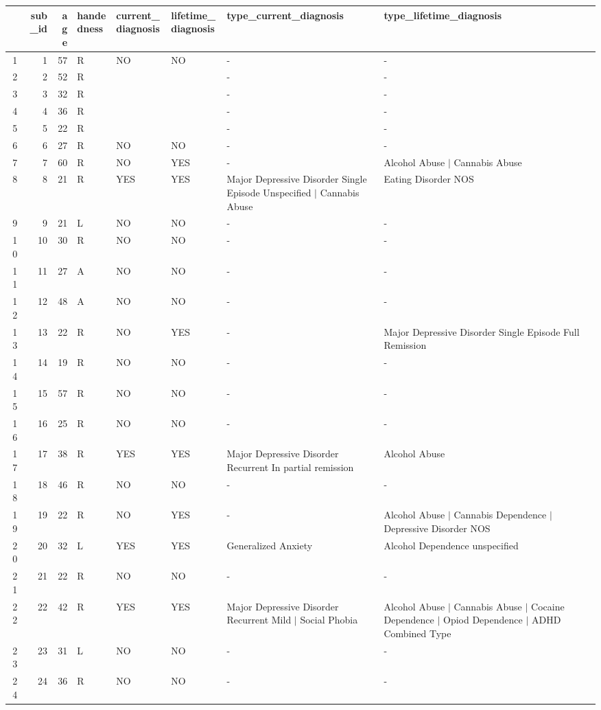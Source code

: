 \begin{table}[ht]
\centering
\begin{tabular}{rrrlllll}
  \hline
 & sub\_id & age & handedness & current\_diagnosis & lifetime\_diagnosis & type\_current\_diagnosis & type\_lifetime\_diagnosis \\ 
  \hline
1 &   1 &  57 & R & NO & NO & - & - \\ 
  2 &   2 &  52 & R &  &  & - & - \\ 
  3 &   3 &  32 & R &  &  & - & - \\ 
  4 &   4 &  36 & R &  &  & - & - \\ 
  5 &   5 &  22 & R &  &  & - & - \\ 
  6 &   6 &  27 & R & NO & NO & - & - \\ 
  7 &   7 &  60 & R & NO & YES & - & Alcohol Abuse $|$ Cannabis Abuse \\ 
  8 &   8 &  21 & R & YES & YES & Major Depressive Disorder Single Episode Unspecified $|$ Cannabis Abuse & Eating Disorder NOS \\ 
  9 &   9 &  21 & L & NO & NO & - & - \\ 
  10 &  10 &  30 & R & NO & NO & - & - \\ 
  11 &  11 &  27 & A & NO & NO & - & - \\ 
  12 &  12 &  48 & A & NO & NO & - & - \\ 
  13 &  13 &  22 & R & NO & YES & - & Major Depressive Disorder Single Episode Full Remission \\ 
  14 &  14 &  19 & R & NO & NO & - & - \\ 
  15 &  15 &  57 & R & NO & NO & - & - \\ 
  16 &  16 &  25 & R & NO & NO & - & - \\ 
  17 &  17 &  38 & R & YES & YES & Major Depressive Disorder Recurrent In partial remission & Alcohol Abuse \\ 
  18 &  18 &  46 & R & NO & NO & - & - \\ 
  19 &  19 &  22 & R & NO & YES & - & Alcohol Abuse $|$ Cannabis Dependence $|$ Depressive Disorder NOS \\ 
  20 &  20 &  32 & L & YES & YES & Generalized Anxiety & Alcohol Dependence unspecified \\ 
  21 &  21 &  22 & R & NO & NO & - & - \\ 
  22 &  22 &  42 & R & YES & YES & Major Depressive Disorder Recurrent Mild $|$ Social Phobia & Alcohol Abuse $|$ Cannabis Abuse $|$ Cocaine Dependence $|$ Opiod Dependence $|$ ADHD Combined Type \\ 
  23 &  23 &  31 & L & NO & NO & - & - \\ 
  24 &  24 &  36 & R & NO & NO & - & - \\ 
   \hline
\end{tabular}
\end{table}
